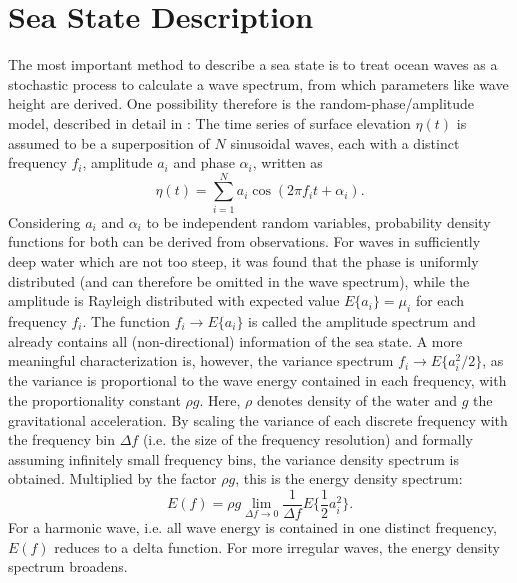\section{Sea State Description}
The most important method 
to describe a sea state is to treat ocean waves as a stochastic process to 
calculate a wave spectrum, from which parameters like wave height are derived. 
One possibility therefore is the random-phase/amplitude model, described in 
detail in \cite{holthuijsen2007}: The time series of surface elevation $ \eta 
(t)$ is assumed to be a superposition of $N$ sinusoidal waves, each with a 
distinct frequency $f_i$, amplitude $a_i$ and phase $\alpha_i$, written as
\begin{equation}
 \label{sinussum}
 \eta(t) = \sum_{i=1}^N a_i \cos (2\pi f_i t + \alpha_i).
\end{equation}
Considering $a_i$ and $\alpha_i$ to be independent random variables, 
probability density functions for both can be derived from observations. For 
waves in sufficiently deep water which are not too steep, it was found that the 
phase is uniformly distributed (and can therefore be omitted in the wave 
spectrum), while the amplitude is Rayleigh distributed with expected value 
$E\{a_i\} = \mu_i$ for each frequency $f_i$. The function $f_i \rightarrow 
E\{a_i\}$ is called the amplitude spectrum and already contains all 
(non-directional) information of the sea state. A more meaningful 
characterization is, however, the variance spectrum $f_i \rightarrow E\{a_i^2 
\slash 2\}$, as the variance is proportional to the wave energy contained in 
each frequency, with the proportionality constant $\rho g$. Here, $\rho$ denotes 
density of the water and $g$ the gravitational acceleration. By scaling the 
variance of each discrete frequency with the frequency bin $\Delta f$ (i.e. the 
size of the frequency resolution) and formally assuming infinitely small 
frequency bins, the variance density spectrum is obtained. Multiplied by the 
factor $\rho g$, this is the energy density spectrum:
\begin{equation}
 \label{vardensspec}
 E(f) = \rho g \lim_{\Delta f \rightarrow 0} \frac{1}{\Delta f} E\{\frac{1}{2} 
a_i^2\}.
\end{equation}
For a harmonic wave, i.e. all wave energy is contained in one distinct 
frequency, $E(f)$ reduces to a delta function. For more irregular waves, the 
energy density spectrum broadens. 

